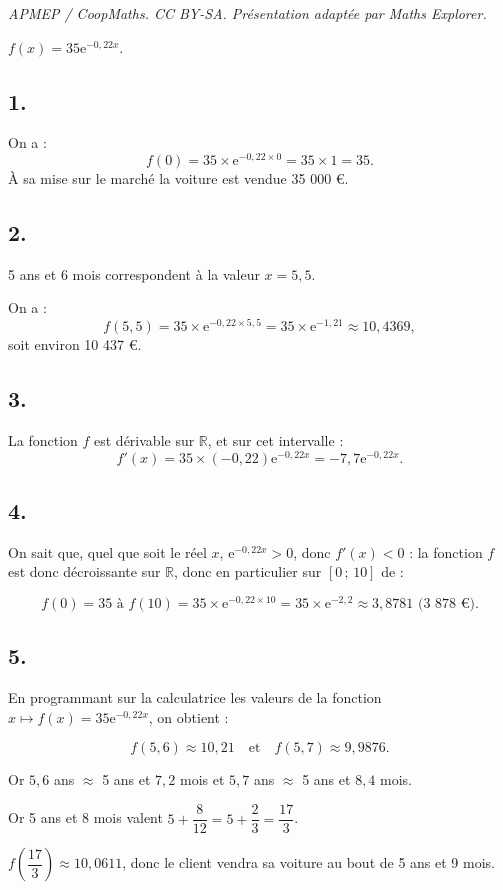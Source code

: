 \documentclass[10pt]{article}
\providecommand{\e}{{\mathrm{e}}}
\begin{document}
\noindent\textit{APMEP / CoopMaths. CC BY-SA. Présentation adaptée par Maths Explorer.}\par\medskip
\( f(x) = 35 \e^{-0{,}22x} \).

\subsection*{1.}

On a :
\[
f(0) = 35 \times \e^{-0{,}22 \times 0} = 35 \times 1 = 35.
\]
À sa mise sur le marché la voiture est vendue 35 000 €.

\subsection*{2.}

5 ans et 6 mois correspondent à la valeur \( x = 5{,}5 \).

On a :
\[
f(5{,}5) = 35 \times \e^{-0{,}22 \times 5{,}5} = 35 \times \e^{-1{,}21} \approx 10{,}4369,
\]
soit environ 10 437 €.

\subsection*{3.}

La fonction \( f \) est dérivable sur \(\mathbb{R}\), et sur cet intervalle :
\[
f'(x) = 35 \times (-0{,}22) \e^{-0{,}22x} = -7{,}7 \e^{-0{,}22x}.
\]

\subsection*{4.}

On sait que, quel que soit le réel \( x \), \( \e^{-0{,}22x} > 0 \), donc \( f'(x) < 0 \) : la fonction \( f \) est donc décroissante sur \(\mathbb{R}\), donc en particulier sur \([0 \,;\, 10]\) de :

\[
f(0) = 35 \text{ à } f(10) = 35 \times \e^{-0{,}22 \times 10} = 35 \times \e^{-2{,}2} \approx 3{,}8781 \text{ (3 878 €)}.
\]

\subsection*{5.}

En programmant sur la calculatrice les valeurs de la fonction \( x \longmapsto f(x) = 35\e^{-0{,}22x} \), on obtient :

\[
f(5{,}6) \approx 10{,}21 \quad \text{et} \quad f(5{,}7) \approx 9{,}9876.
\]

Or \(5{,}6\) ans \( \approx \) 5 ans et \(7{,}2\) mois et \(5{,}7\) ans \( \approx \) 5 ans et \(8{,}4\) mois.

Or 5 ans et 8 mois valent \( 5 + \dfrac{8}{12} = 5 + \dfrac{2}{3} = \dfrac{17}{3} \).

\( f\left(\dfrac{17}{3}\right) \approx 10{,}0611 \), donc le client vendra sa voiture au bout de 5 ans et 9 mois.
\end{document}
